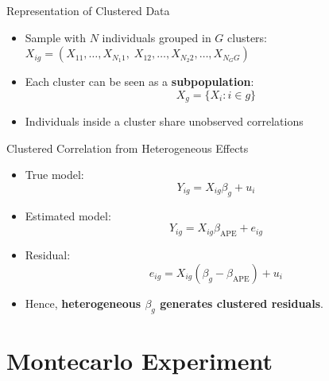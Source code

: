 \documentclass[
  ignorenonframetext,
]{beamer}
\providecommand{\tightlist}{%
  \setlength{\itemsep}{0pt}\setlength{\parskip}{0pt}}
\begin{document}
\begin{frame}{Representation of Clustered Data}
\label{representation-of-clustered-data}
\begin{itemize}
\tightlist
\item
  Sample with \(N\) individuals grouped in \(G\) clusters:\\
  \(X_{ig} = (X_{11},\dots,X_{N_1 1},\; X_{12},\dots,X_{N_2 2},\dots,X_{N_G G})\)\\
\item
  Each cluster can be seen as a \textbf{subpopulation}:\\
  \[
  X_g = \{X_i: i \in g\}
  \]
\item
  Individuals inside a cluster share unobserved correlations
\end{itemize}
\end{frame}

\begin{frame}{Clustered Correlation from Heterogeneous Effects}
\label{clustered-correlation-from-heterogeneous-effects}
\begin{itemize}
\tightlist
\item
  True model:\\
  \[
  Y_{ig} = X_{ig}\beta_g + u_i
  \]
\item
  Estimated model:\\
  \[
  Y_{ig} = X_{ig}\beta_{\text{APE}} + e_{ig}
  \]
\item
  Residual:\\
  \[
  e_{ig} = X_{ig}(\beta_g - \beta_{\text{APE}}) + u_i
  \]
\item
  Hence, \textbf{heterogeneous \(\beta_g\) generates clustered
  residuals}.
\end{itemize}
\end{frame}

\begin{frame}
\end{frame}

\section{Montecarlo Experiment}\label{montecarlo-experiment}
\end{document}
